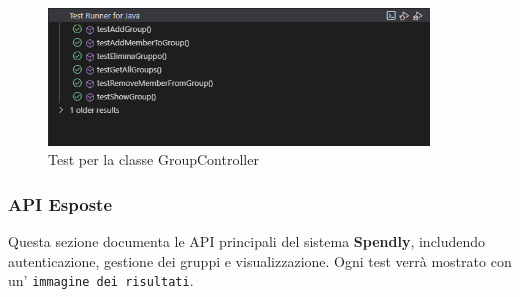 \begin{figure}[H]
    \centering
    \includegraphics[width=0.9\textwidth]{images/TestGroupController.png}
    \caption{Test per la classe GroupController}
    \label{fig:GroupController_test}
\end{figure}


\subsubsection{API Esposte}

Questa sezione documenta le API principali del sistema \textbf{Spendly}, includendo autenticazione, gestione dei gruppi e visualizzazione. Ogni test verrà mostrato con un' \texttt{immagine dei risultati}.

